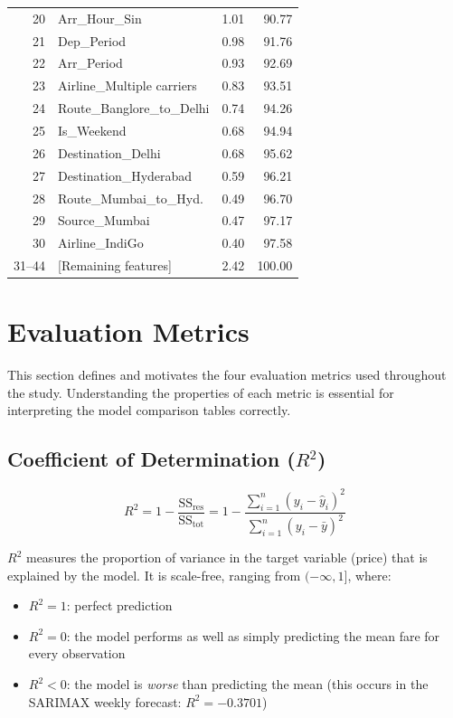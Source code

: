 \documentclass[12pt, a4paper]{article}
\begin{document}
\begin{table}[h]
\begin{tabular}{rlrr}
20 & Arr\_Hour\_Sin             &  1.01 & 90.77 \\
21 & Dep\_Period                &  0.98 & 91.76 \\
22 & Arr\_Period                &  0.93 & 92.69 \\
23 & Airline\_Multiple carriers &  0.83 & 93.51 \\
24 & Route\_Banglore\_to\_Delhi &  0.74 & 94.26 \\
25 & Is\_Weekend                &  0.68 & 94.94 \\
26 & Destination\_Delhi         &  0.68 & 95.62 \\
27 & Destination\_Hyderabad     &  0.59 & 96.21 \\
28 & Route\_Mumbai\_to\_Hyd.   &  0.49 & 96.70 \\
29 & Source\_Mumbai             &  0.47 & 97.17 \\
30 & Airline\_IndiGo            &  0.40 & 97.58 \\
31--44 & [Remaining features]  & 2.42  & 100.00 \\
\bottomrule
\end{tabular}
\end{table}

\section{Evaluation Metrics}
\label{sec:metrics}

This section defines and motivates the four evaluation metrics used throughout
the study.  Understanding the properties of each metric is essential for
interpreting the model comparison tables correctly.

\subsection{Coefficient of Determination ($R^2$)}

\begin{equation}
R^2 = 1 - \frac{\text{SS}_{\text{res}}}{\text{SS}_{\text{tot}}} = 1 - \frac{\sum_{i=1}^{n}(y_i - \hat{y}_i)^2}{\sum_{i=1}^{n}(y_i - \bar{y})^2}
\end{equation}

$R^2$ measures the proportion of variance in the target variable (price)
that is explained by the model.  It is scale-free, ranging from $(-\infty, 1]$,
where:
\begin{itemize}
    \item $R^2 = 1$: perfect prediction
    \item $R^2 = 0$: the model performs as well as simply predicting the mean
    fare for every observation
    \item $R^2 < 0$: the model is \textit{worse} than predicting the mean (this
    occurs in the SARIMAX weekly forecast: $R^2 = -0.3701$)
\end{itemize}
\end{document}
